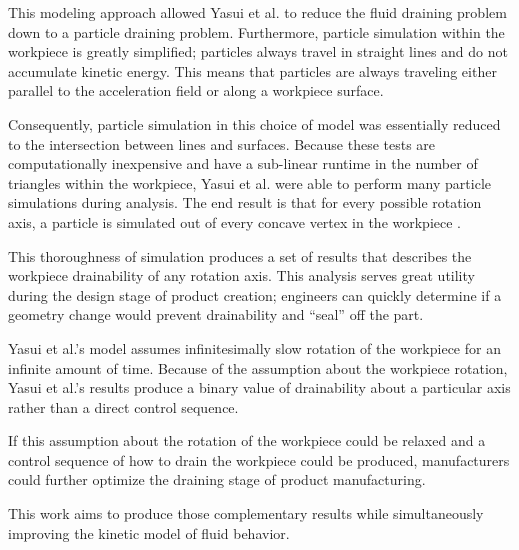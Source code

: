 This modeling approach allowed Yasui et al. to reduce the fluid draining problem down to a particle draining problem. Furthermore, particle simulation within the workpiece is greatly simplified; particles always travel in straight lines and do not accumulate kinetic energy. This means that particles are always traveling either parallel to the acceleration field or along a workpiece surface.

Consequently, particle simulation in this choice of model was essentially reduced to the intersection between lines and surfaces. Because these tests are computationally inexpensive and have a sub-linear runtime in the number of triangles within the workpiece, Yasui et al. were able to perform many particle simulations during analysis. The end result is that for every possible rotation axis, a particle is simulated out of every concave vertex in the workpiece \cite{Yasui2011}.

This thoroughness of simulation produces a set of results that describes the workpiece drainability of any rotation axis. This analysis serves great utility during the design stage of product creation; engineers can quickly determine if a geometry change would prevent drainability and ``seal'' off the part.

Yasui et al.'s model assumes infinitesimally slow rotation of the workpiece for an infinite amount of time. Because of the assumption about the workpiece rotation, Yasui et al.'s results produce a binary value of drainability about a particular axis rather than a direct control sequence.

If this assumption about the rotation of the workpiece could be relaxed and a  control sequence of how to drain the workpiece could be produced, manufacturers could further optimize the draining stage of product manufacturing.

This work aims to produce those complementary results while simultaneously improving the kinetic model of fluid behavior.




